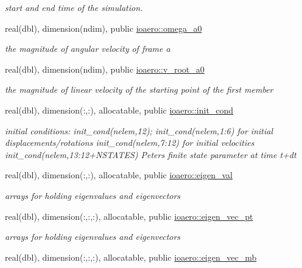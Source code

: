 \begin{DoxyCompactItemize}
\begin{DoxyCompactList}\small\item\em start and end time of the simulation. \end{DoxyCompactList}\item 
real(dbl), dimension(ndim), public \hyperlink{namespaceioaero_a38fc5ef87ae7c2e312ad32f857e791cb}{ioaero\+::omega\+\_\+a0}
\begin{DoxyCompactList}\small\item\em the magnitude of angular velocity of frame a \end{DoxyCompactList}\item 
real(dbl), dimension(ndim), public \hyperlink{namespaceioaero_a3cefdbd9d62bffe41f44b7f79f321f67}{ioaero\+::v\+\_\+root\+\_\+a0}
\begin{DoxyCompactList}\small\item\em the magnitude of linear velocity of the starting point of the first member \end{DoxyCompactList}\item 
real(dbl), dimension(\+:,\+:), allocatable, public \hyperlink{namespaceioaero_ad88d83709eb2f4596a89098db11ba770}{ioaero\+::init\+\_\+cond}
\begin{DoxyCompactList}\small\item\em initial conditions\+: init\+\_\+cond(nelem,12); init\+\_\+cond(nelem,1\+:6) for initial displacements/rotations init\+\_\+cond(nelem,7\+:12) for initial velocities init\+\_\+cond(nelem,13\+:12+\+N\+S\+T\+A\+T\+ES) Peters finite state parameter at time t+dt \end{DoxyCompactList}\item 
real(dbl), dimension(\+:,\+:), allocatable, public \hyperlink{namespaceioaero_ae043619051217506f070ece6f24deedf}{ioaero\+::eigen\+\_\+val}
\begin{DoxyCompactList}\small\item\em arrays for holding eigenvalues and eigenvectors \end{DoxyCompactList}\item 
real(dbl), dimension(\+:,\+:,\+:), allocatable, public \hyperlink{namespaceioaero_a53e09660909f61713dee3887a3adc1ec}{ioaero\+::eigen\+\_\+vec\+\_\+pt}
\begin{DoxyCompactList}\small\item\em arrays for holding eigenvalues and eigenvectors \end{DoxyCompactList}\item 
real(dbl), dimension(\+:,\+:,\+:), allocatable, public \hyperlink{namespaceioaero_a0d150f0b81c676515b90fcf83d7ff8c3}{ioaero\+::eigen\+\_\+vec\+\_\+mb}

\end{DoxyCompactItemize}
